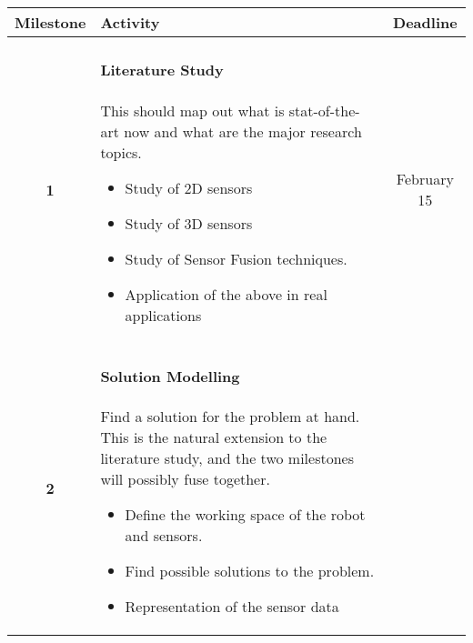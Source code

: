 \documentclass[a4paper, 10pt]{article}
\begin{document}
\begin{tabular}{| c | p{11.5cm} || c |}
    \hline
        Milestone   &   Activity    &   Deadline \\
    \hline
    \hline
        \textbf{1}  &   \paragraph{Literature Study} This should map out what is
                        stat-of-the-art now and what are the major research topics.
                        \begin{itemize}
                            \item Study of 2D sensors 
                            \item Study of 3D sensors
                            \item Study of Sensor Fusion techniques.
                            \item Application of the above in real applications
                        \end{itemize}
                                                       
                                                       & February 15 \\
        \hline
        \textbf{2}  &   \paragraph{Solution Modelling} Find a solution for the problem
                        at hand. This is the natural extension to the literature study,
                        and the two milestones will possibly fuse together. 
                        \begin{itemize}
                            \item Define the working space of the robot and sensors. 
                            \item Find possible solutions to the problem. 
                            \item Representation of the sensor data
                        \end{itemize}
                                   

\end{tabular}
\end{document}

